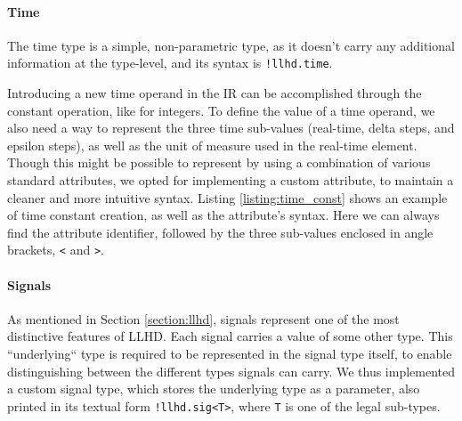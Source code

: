 
\paragraph{Time}
The time type is a simple, non-parametric type, as it doesn’t carry any additional information at the type-level, and its syntax is \texttt{!llhd.time}.

Introducing a new time operand in the IR can be accomplished through the constant operation, like for integers. To define the value of a time operand, we also need a way to represent the three time sub-values (real-time, delta steps, and epsilon steps), as well as the unit of measure used in the real-time element. Though this might be possible to represent by using a combination of various standard attributes, we opted for implementing a custom attribute, to maintain a cleaner and more intuitive syntax. Listing \ref{listing:time_const} shows an example of time constant creation, as well as the attribute's syntax. Here we can always find the attribute identifier, followed by the three sub-values enclosed in angle brackets, \texttt{<} and \texttt{>}.


\paragraph{Signals}
As mentioned in Section \ref{section:llhd}, signals represent one of the most distinctive features of LLHD. Each signal carries a value of some other type. This “underlying“ type is required to be represented in the signal type itself, to enable distinguishing between the different types signals can carry. We thus implemented a custom signal type, which stores the underlying type as a parameter, also printed in its textual form \texttt{!llhd.sig<T>}, where \texttt{T} is one of the legal sub-types.

